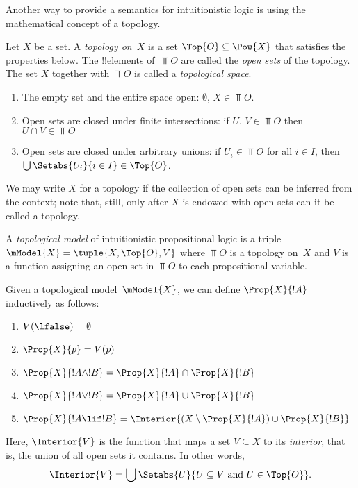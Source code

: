 \documentclass[../../../include/open-logic-section]{subfiles}
\begin{document}


Another way to provide a semantics for intuitionistic logic is using
the mathematical concept of a topology.

\begin{defn}
  Let $X$ be a set. A \emph{topology on~$X$} is a set $\Top{O}
  \subseteq \Pow{X}$ that satisfies the properties below. The
  !!{element}s of~$\Top{O}$ are called the \emph{open sets} of the
  topology. The set $X$ together with $\Top{O}$ is called a
  \emph{topological space}.
  \begin{enumerate}
  \item The empty set and the entire space open: $\emptyset$, $X \in
    \Top{O}$.
  \item Open sets are closed under finite intersections: if $U$, $V \in
    \Top{O}$ then $U \cap V \in \Top{O}$
  \item Open sets are closed under arbitrary unions: if $U_i \in
    \Top{O}$ for all $i \in I$, then $\bigcup \Setabs{U_i}{i \in
      I} \in \Top{O}$.
  \end{enumerate}
\end{defn}

We may write $X$ for a topology if the collection of open sets can be
inferred from the context; note that, still, only after $X$ is endowed
with open sets can it be called a topology.

\begin{defn}
  A \emph{topological model} of intuitionistic propositional logic is
  a triple $\mModel{X} = \tuple{X, \Top{O}, V}$ where $\Top{O}$ is a
  topology on~$X$ and $V$ is a function assigning an open set in
  $\Top{O}$ to each propositional variable.

  Given a topological model~$\mModel{X}$, we can define $\Prop{X}{!A}$
  inductively as follows:
  \begin{enumerate}
  \item $V(\lfalse) = \emptyset$
  \item $\Prop{X}{p} = V(p)$
  \item $\Prop{X}{!A \land !B} = \Prop{X}{!A} \cap \Prop{X}{!B}$
  \item $\Prop{X}{!A \lor !B} = \Prop{X}{!A} \cup \Prop{X}{!B}$
  \item $\Prop{X}{!A \lif !B} = \Interior{(X \setminus \Prop{X}{!A}) \cup
    \Prop{X}{!B}}$
  \end{enumerate}
  Here, $\Interior{V}$ is the function that maps a set $V \subseteq X$
  to its \emph{interior}, that is, the union of all open sets it
  contains. In other words,
  \[
  \Interior{V} = \bigcup \Setabs{U}{U \subseteq V \text{ and } U \in \Top{O}}.
  \]
\end{defn}
\end{document}
